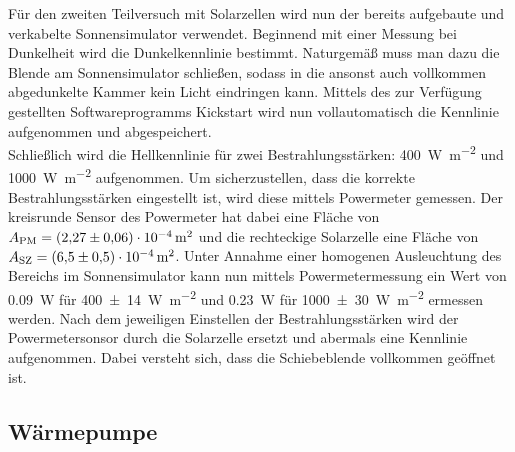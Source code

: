 \documentclass[english, ngerman]{scrartcl}
\begin{document}
Für den zweiten Teilversuch mit Solarzellen wird nun der bereits aufgebaute und verkabelte Sonnensimulator verwendet. Beginnend mit einer Messung bei Dunkelheit wird die Dunkelkennlinie bestimmt. Naturgemäß muss man dazu die Blende am Sonnensimulator schließen, sodass in die ansonst auch vollkommen abgedunkelte Kammer kein Licht eindringen kann. Mittels des zur Verfügung gestellten Softwareprogramms \glq Kickstart \grq wird nun vollautomatisch die Kennlinie aufgenommen und abgespeichert.\\
Schließlich wird die Hellkennlinie für zwei Bestrahlungsstärken: \SI{400}{\watt\per\meter\squared} und \SI{1000}{\watt\per\meter\squared} aufgenommen. Um sicherzustellen, dass die korrekte Bestrahlungsstärken eingestellt ist, wird diese mittels Powermeter gemessen. Der kreisrunde Sensor des Powermeter hat dabei eine Fläche von $A_{\text{PM}} = \SI{2.27(6)e-4}{m\squared}$ und die rechteckige Solarzelle eine Fläche von $A_{\text{SZ}} = \SI{6.5(5)e-4}{m\squared}$. Unter Annahme einer homogenen Ausleuchtung des Bereichs im Sonnensimulator kann nun mittels Powermetermessung ein Wert von \SI{0,09}{\watt} für \SI{400(14)}{\watt\per\meter\squared} und \SI{0,23}{\watt} für \SI{1000(30)}{\watt\per\meter\squared} ermessen werden. Nach dem jeweiligen Einstellen der Bestrahlungsstärken wird der Powermetersonsor durch die Solarzelle ersetzt und abermals eine Kennlinie aufgenommen. Dabei versteht sich, dass die Schiebeblende vollkommen geöffnet ist.


\subsection{Wärmepumpe}
\label{subsec:durchfuehrung_waermepumpe}
\end{document}
